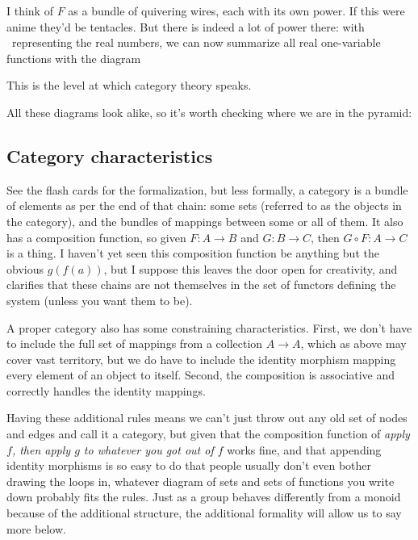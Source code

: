 \documentclass[11pt]{article}
\begin{document}

I think of $F$ as a bundle of quivering wires, each with its own power. If this were anime
they'd be tentacles. But there is indeed a lot of power there: with \Re\ representing the
real numbers, we can now summarize all real one-variable functions with the diagram 

This is the level at which category theory speaks.

All these diagrams look alike, so it's worth checking where we are in the pyramid:

\subsection{Category characteristics}
See the flash cards for the formalization, but less formally,
a category is a bundle of elements as per the end of that chain: some sets
(referred to as the objects in the category), and the bundles of mappings between some
or all of them.  It also has a composition function, so given $F:A\to B$
and $G:B\to C$, then $G\circ F:A\to C$ is a thing. I haven't yet seen this composition
function be anything but the obvious $g(f(a))$, but I suppose this leaves the door
open for creativity, and clarifies that these chains are not themselves in the set of
functors defining the system (unless you want them to be).

A proper category also has some
constraining characteristics. First, we don't have to include the full set of mappings from a
collection $A\to A$, which as above may cover vast territory, but we do have to include
the identity morphism mapping every element of an object to itself. Second, the composition
is associative and correctly handles the identity mappings.

Having these additional rules means we can't just throw out any old set of nodes and edges
and call it a category, but given that the composition function of {\em apply $f$, then
apply $g$ to whatever you got out of $f$} works fine, and that appending identity
morphisms is so easy to do that people usually don't even bother drawing the loops in,
whatever diagram of sets and sets of functions you write down probably fits the rules.
Just as a group behaves differently from a monoid because of the additional structure,
the additional formality will allow us to say more below.
\end{document}
